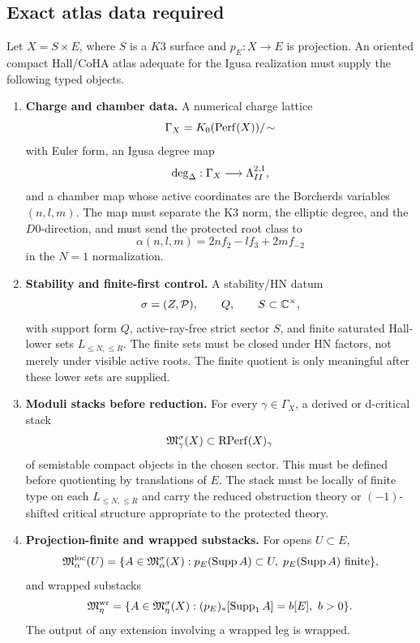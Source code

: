 \subsection{Exact atlas data required}

Let \(X=S\times E\), where \(S\) is a \(K3\) surface and
\(p_E:X\to E\) is projection.  An oriented compact Hall/CoHA atlas
adequate for the Igusa realization must supply the following typed
objects.

\begin{enumerate}
\item \textbf{Charge and chamber data.}
A numerical charge lattice
\[
   \Gamma_X=K_0(\operatorname{Perf}(X))/\!\sim
\]
with Euler form, an Igusa degree map
\[
   \deg_{\Delta}:\Gamma_X\longrightarrow \Lambda^{2,1}_{II},
\]
and a chamber map whose active coordinates are the Borcherds variables
\((n,l,m)\).  The map must separate the K3 norm, the elliptic degree,
and the \(D0\)-direction, and must send the protected root class to
\[
   \alpha(n,l,m)=2n f_2-lf_3+2m f_{-2}
\]
in the \(N=1\) normalization.

\item \textbf{Stability and finite-first control.}
A stability/HN datum
\[
   \sigma=(Z,\mathcal P),\qquad Q,\qquad S\subset\mathbb C^\times,
\]
with support form \(Q\), active-ray-free strict sector \(S\), and
finite saturated Hall-lower sets \(L_{\leq N,\leq R}\).  The finite
sets must be closed under HN factors, not merely under visible active
roots.  The finite quotient is only meaningful after these lower sets
are supplied.

\item \textbf{Moduli stacks before reduction.}
For every \(\gamma\in\Gamma_X\), a derived or d-critical stack
\[
   \mathfrak M^\sigma_\gamma(X)
      \subset \operatorname{RPerf}(X)_\gamma
\]
of semistable compact objects in the chosen sector.  This must be
defined before quotienting by translations of \(E\).  The stack must be
locally of finite type on each \(L_{\leq N,\leq R}\) and carry the
reduced obstruction theory or \((-1)\)-shifted critical structure
appropriate to the protected theory.

\item \textbf{Projection-finite and wrapped substacks.}
For opens \(U\subset E\),
\[
   \mathfrak M^{\mathrm{loc}}_\alpha(U)
   =
   \{A\in\mathfrak M^\sigma_\alpha(X):
     p_E(\operatorname{Supp} A)\subset U,\;p_E(\operatorname{Supp} A)\hbox{ finite}\},
\]
and wrapped substacks
\[
   \mathfrak M^{\mathrm{wr}}_\eta
   =
   \{A\in\mathfrak M^\sigma_\eta(X):
     (p_E)_*[\operatorname{Supp}_1 A]=b[E],\ b>0\}.
\]
The output of any extension involving a wrapped leg is wrapped.


\end{enumerate}
